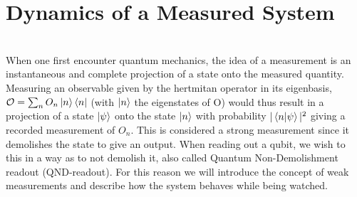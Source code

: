 


\section{Dynamics of a Measured System}
 \\
\noindent
When one first encounter quantum mechanics, the idea of a measurement is an instantaneous and complete projection of a state onto the measured quantity. Measuring an observable given by the hertmitan operator in its eigenbasis, $\mathcal{O} = \sum_n O_n \ket{n}\bra{n}$ (with $\ket{n}$ the eigenstates of O) would thus result in a projection of a state $\ket{\psi}$ onto the state $\ket{n}$ with probability $|\braket{n}{\psi}|^2$ giving a recorded measurement of $O_n$.  This is considered a strong measurement since it demolishes the state to give an output. When reading out a qubit, we wish to this in a way as to not demolish it, also called Quantum Non-Demolishment readout (QND-readout). For this reason we will introduce the concept of weak measurements and describe how the system behaves while being watched.

